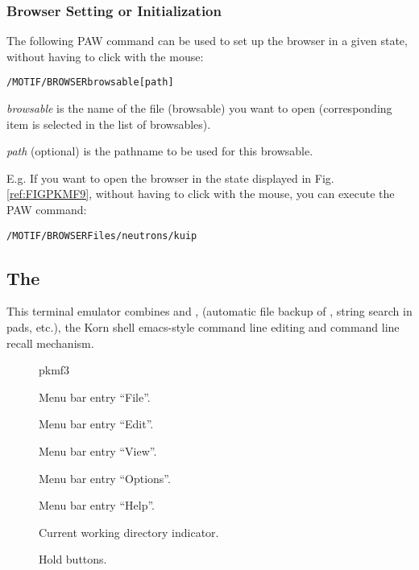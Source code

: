 \subsubsection{Browser Setting or Initialization}
\label{ref:rebroinit}


The following PAW command can be used to set up the browser
in a given state, without having to click with the mouse:
\begin{alltt}
 /MOTIF/BROWSER browsable [path]
\end{alltt}
\begin{UL}
\item {\it browsable} is the name of the file (browsable) you want to
open (corresponding item is selected in the list of browsables).
\item {\it path} (optional) is the pathname to be used for this browsable.
\end{UL}
E.g. If you want to open the browser in the state displayed in 
Fig. \ref{ref:FIGPKMF9}, without having to click with the mouse, you
can execute the PAW command:
\begin{alltt}
  /MOTIF/BROWSER Files /neutrons/kuip
\end{alltt}

\subsection{The \EW{}}
\label{ref:rekxterm}

This terminal emulator combines 
\INP{} and \TP{}, (automatic file backup 
of \TP{}, string search in pads, etc.), the Korn shell 
emacs-style command line editing and command line recall mechanism.

\begin{figure}
\begin{PICTf}[.73]{pkmf3}
\begin{EnumZW}
\item Menu bar entry ``File''.
\item Menu bar entry ``Edit''.
\item Menu bar entry ``View''.
\item Menu bar entry ``Options''.
\item Menu bar entry ``Help''.
\end{EnumZW}
\begin{EnumZB}
\item \INP{}
\item \TP{}
\item Current working directory indicator.
\item Hold buttons.
\end{EnumZB}
\end{PICTf}
\caption{\EW{}}
\label{ref:FIGPKMF3}
\end{figure}

